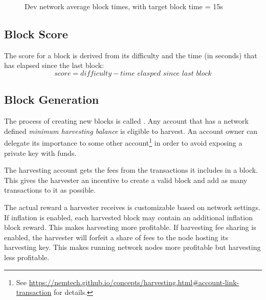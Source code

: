 \begin{figure}
	\caption{Dev network average block times, with target block time = 15s}
\end{figure}

\subsection{Block Score}

The score for a block is derived from its difficulty and the time (in seconds) that has elapsed since the last block:
\begin{equation}
\tag{block score} \mathit{score} = \mathit{difficulty} - \textit{time elasped since last block}
\end{equation}

\subsection{Block Generation} \label{sec:blockGeneration}

The process of creating new blocks is called .
Any account that has a network defined \textit{minimum harvesting balance} is eligible to harvest.
An account owner can delegate its importance to some other account\footnote{See \url{https://nemtech.github.io/concepts/harvesting.html\#account-link-transaction} for details.} in order to avoid exposing a private key with funds.

The harvesting account gets the fees from the transactions it includes in a block.
This gives the harvester an incentive to create a valid block and add as many transactions to it as possible.

The actual reward a harvester receives is customizable based on network settings.
If inflation is enabled, each harvested block may contain an additional inflation block reward.
This makes harvesting more profitable.
If harvesting fee sharing is enabled, the harvester will forfeit a share of fees to the node hosting its harvesting key.
This makes running network nodes more profitable but harvesting less profitable.

